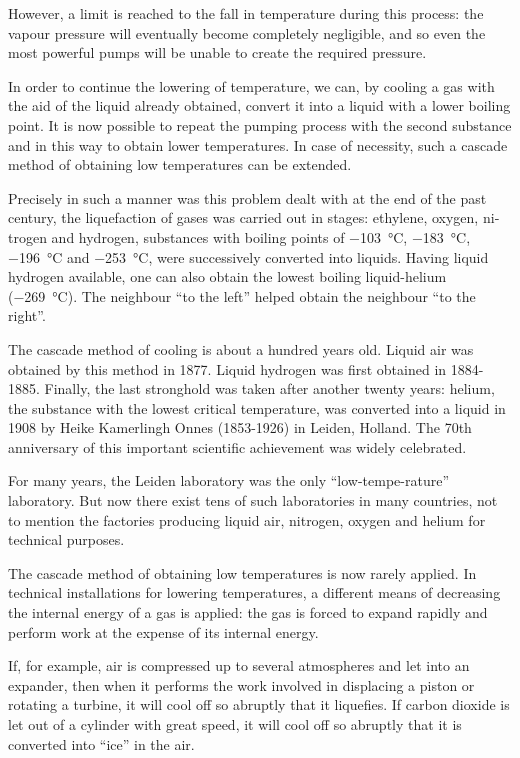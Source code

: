 However, a limit is reached to the fall in temperature during this process: the vapour pressure will eventually become completely negligible, and so even the most pow­erful pumps will be unable to create the required pres­sure.

In order to continue the lowering of temperature, we can, by cooling a gas with the aid of the liquid already obtained, convert it into a liquid with a lower boiling point. It is now possible to repeat the pumping process with the second substance and in this way to obtain lower temperatures. In case of necessity, such a cascade method of obtaining low temperatures can be extended.

Precisely in such a manner was this problem dealt with at the end of the past century, the liquefaction of gases was carried out in stages: ethylene, oxygen, ni­trogen and hydrogen, substances with boiling points of \SI{-103}{\celsius}, \SI{-183}{\celsius}, \SI{-196}{\celsius} and \SI{-253}{\celsius}, were successively converted into liquids. Having liquid hydrogen available, one can also obtain the lowest boiling liquid-helium (\SI{-269}{\celsius}). The neighbour ``to the left'' helped obtain the neighbour ``to the right''.

The cascade method of cooling is about a hundred years old. Liquid air was obtained by this method in 1877. Liquid hydrogen was first obtained in 1884-1885. Finally, the last stronghold was taken after another twenty years: helium, the substance with the lowest critical tempera­ture, was converted into a liquid in 1908 by Heike Kamerlingh Onnes (1853-1926) in Leiden, Holland. The 70th anniversary of this important scientific achievement was widely celebrated.

For many years, the Leiden laboratory was the only ``low-tempe-rature'' laboratory. But now there exist tens of such laboratories in many countries, not to mention the factories producing liquid air, nitrogen, oxygen and he­lium for technical purposes.

The cascade method of obtaining low temperatures is now rarely applied. In technical installations for lowering temperatures, a different means of decreasing the internal energy of a gas is applied: the gas is forced to expand ra­pidly and perform work at the expense of its internal energy.

If, for example, air is compressed up to several atmo­spheres and let into an expander, then when it performs the work involved in displacing a piston or rotating a turbine, it will cool off so abruptly that it liquefies. If carbon dioxide is let out of a cylinder with great speed, it will cool off so abruptly that it is converted into ``ice'' in the air.

